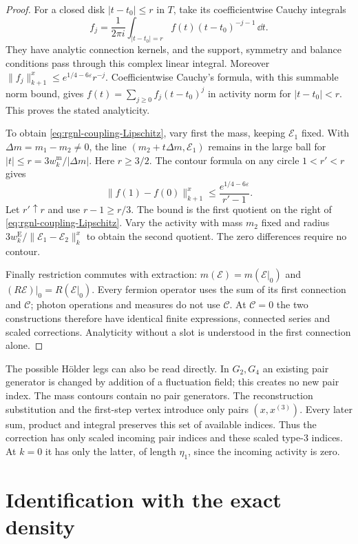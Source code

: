 \begin{proof}
For a closed disk $|t-t_0|\le r$ in $T$, take its
coefficientwise Cauchy integrals
\[
 f_j=\frac1{2\pi i}\int_{|t-t_0|=r}
                             f(t)(t-t_0)^{-j-1}\,\dd t.
\]
They have analytic connection kernels, and the support,
symmetry and balance conditions pass through this
complex linear integral. Moreover
$\|f_j\|_{k+1}^x\le e^{1/4-6\varepsilon}r^{-j}$.
Coefficientwise Cauchy's formula, with this summable
norm bound, gives
$f(t)=\sum_{j\ge0}f_j(t-t_0)^j$ in activity norm for
$|t-t_0|<r$. This proves the stated analyticity.

To obtain \eqref{eq:rgnl-coupling-Lipschitz}, vary first
the mass, keeping $\mathscr E_1$ fixed. With
$\Delta m=m_1-m_2\ne0$, the line
$(m_2+t\Delta m,\mathscr E_1)$ remains in the large
ball for $|t|\le r=3w_k^{\mathrm m}/|\Delta m|$.
Here $r\ge3/2$. The contour formula on any circle
$1<r'<r$ gives
\[
 \|f(1)-f(0)\|_{k+1}^x
        \le\frac{e^{1/4-6\varepsilon}}{r'-1}.
\]
Let $r'\uparrow r$ and use $r-1\ge r/3$.
The bound is the first quotient on the right of
\eqref{eq:rgnl-coupling-Lipschitz}.
Vary the activity with mass $m_2$ fixed and radius
$3w_k^{\mathrm E}/\|\mathscr E_1-\mathscr E_2\|_k^x$
to obtain the second quotient.
The zero differences require no contour.

Finally restriction commutes with extraction:
$m(\mathscr E)=m(\mathscr E|_0)$ and
$(R\mathscr E)|_0=R(\mathscr E|_0)$.
Every fermion operator uses the sum of its first
connection and $\mathscr C$; photon operations and
measures do not use $\mathscr C$.
At $\mathscr C=0$ the two constructions therefore have
identical finite expressions, connected series and
scaled corrections. Analyticity without a slot is
understood in the first connection alone.
\end{proof}

The possible H\"older legs can also be read directly.
In $G_2,G_4$ an existing pair generator is changed by
addition of a fluctuation field; this creates no new
pair index. The mass contours contain no pair
generators. The reconstruction substitution and the
first-step vertex introduce only pairs $(x,x^{(3)})$.
Every later sum, product and integral preserves this
set of available indices. Thus the correction has
only scaled incoming pair indices and these scaled
type-$3$ indices. At $k=0$ it has only the latter,
of length $\eta_1$, since the incoming activity is zero.

\section{Identification with the exact density}
\label{subsec:rgnl-current-step}

